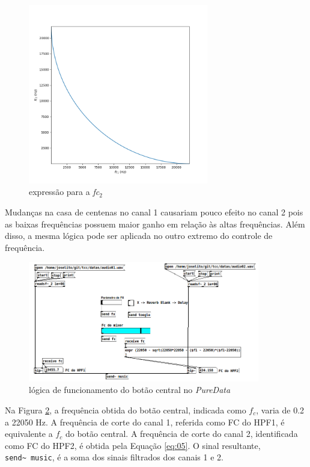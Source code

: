 \begin{figure}[h]
    \centering
    \includegraphics[width=0.7\textwidth]{figuras/fig45.png}
    \caption{expressão para a \textit{fc$_{2}$}}
    \label{fig45}
\end{figure}

Mudanças na casa de centenas no canal 1 causariam pouco efeito no canal 2 pois as baixas frequências possuem maior ganho em relação às altas frequências. Além disso, a mesma lógica pode ser aplicada no outro extremo do controle de frequência.

\begin{figure}[h]
    \centering
    \includegraphics[width=0.9\textwidth]{figuras/fig44.png}
    \caption{lógica de funcionamento do botão central no \textit{PureData}}
    \label{fig44}
\end{figure}

Na Figura \ref{fig44}, a frequência obtida do botão central, indicada como \( f_c \), varia de 0.2 a 22050 Hz. A frequência de corte do canal 1, referida como FC do HPF1, é equivalente a \( f_c \) do botão central. A frequência de corte do canal 2, identificada como FC do HPF2, é obtida pela Equação \ref{eq:05}. O sinal resultante, \texttt{send\textasciitilde\ music}, é a soma dos sinais filtrados dos canais 1 e 2.

